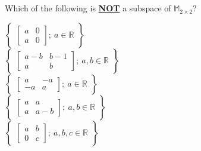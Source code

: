 \documentclass[12pt]{exam}
\newcommand{\newquestion}[3]{\fontsize{12}{14}\selectfont\uplevel{#1[Qu.] \fontsize{14}{16}\selectfont\ifthenelse{\equal{#2}{}}{[1 mark(s)]\\}{[#2 x 1 mark(s)]\\}\fontsize{14}{16}\selectfont\\[-1em]#3}\fontsize{14}{16}\selectfont}
\begin{document}
\begin{multicols*}{2}
\begin{questions}
\begin{oneparchoices}
\begin{tabular}{r l l l l l}
        \end{tabular}
    \end{oneparchoices}
    \\[-2em]
    \uplevel{\noindent\rule{\linewidth}{0.5pt}}
    \ \\[-2.5em]
    \newquestion{}{}{\\[-2em]}
    \question Which of the following is \textbf{\underline{NOT}} a subspace of $\mathbb{M}_{2\times2}$?\\[+.5em]
    \begin{oneparchoices}
        \choice $\begin{Bmatrix}
            \begin{bmatrix}
                a & 0\\a & 0
            \end{bmatrix};~a \in \mathbb{R}
        \end{Bmatrix}$\\[+1em]
        \choice $\begin{Bmatrix}
            \begin{bmatrix}
                a -b & b-1\\a & b
            \end{bmatrix};~a,b \in \mathbb{R}
        \end{Bmatrix}$\\[+1em]
        \choice $\begin{Bmatrix}
            \begin{bmatrix}
                a & -a\\-a & a
            \end{bmatrix};~a \in \mathbb{R}
        \end{Bmatrix}$\\[+1em]
        \choice $\begin{Bmatrix}
            \begin{bmatrix}
                a & a\\a & a-b
            \end{bmatrix};~a,b \in \mathbb{R}
        \end{Bmatrix}$\\[+1em]
        \choice $\begin{Bmatrix}
            \begin{bmatrix}
                a & b\\0 & c
            \end{bmatrix};~a,b,c \in \mathbb{R}
        \end{Bmatrix}$
    \end{oneparchoices}

\end{questions}
\end{multicols*}
\end{document}

